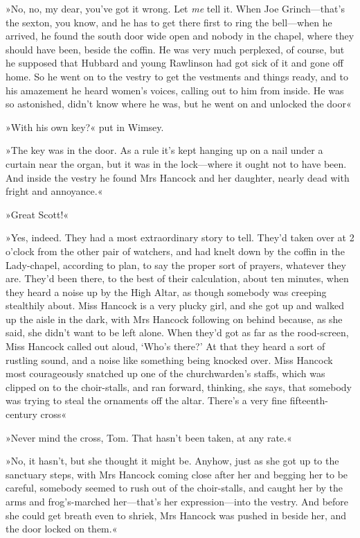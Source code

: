 »No, no, my dear, you've got it wrong. Let \textit{me} tell it. When Joe Grinch—that's the sexton, you know, and he has to get there first to ring the bell—when he arrived, he found the south door wide open and nobody in the chapel, where they should have been, beside the coffin. He was very much perplexed, of course, but he supposed that Hubbard and young Rawlinson had got sick of it and gone off home. So he went on to the vestry to get the vestments and things ready, and to his amazement he heard women's voices, calling out to him from inside. He was so astonished, didn't know where he was, but he went on and unlocked the door\longdash«

»With his own key?« put in Wimsey.

»The key was in the door. As a rule it's kept hanging up on a nail under a curtain near the organ, but it was in the lock—where it ought not to have been. And inside the vestry he found Mrs Hancock and her daughter, nearly dead with fright and annoyance.«

»Great Scott!«

»Yes, indeed. They had a most extraordinary story to tell. They'd taken over at 2 o'clock from the other pair of watchers, and had knelt down by the coffin in the Lady-chapel, according to plan, to say the proper sort of prayers, whatever they are. They'd been there, to the best of their calculation, about ten minutes, when they heard a noise up by the High Altar, as though somebody was creeping stealthily about. Miss Hancock is a very plucky girl, and she got up and walked up the aisle in the dark, with Mrs Hancock following on behind because, as she said, she didn't want to be left alone. When they'd got as far as the rood-screen, Miss Hancock called out aloud, `Who's there?' At that they heard a sort of rustling sound, and a noise like something being knocked over. Miss Hancock most courageously snatched up one of the churchwarden's staffs, which was clipped on to the choir-stalls, and ran forward, thinking, she says, that somebody was trying to steal the ornaments off the altar. There's a very fine fifteenth-century cross\longdash«

»Never mind the cross, Tom. That hasn't been taken, at any rate.«

»No, it hasn't, but she thought it might be. Anyhow, just as she got up to the sanctuary steps, with Mrs Hancock coming close after her and begging her to be careful, somebody seemed to rush out of the choir-stalls, and caught her by the arms and frog's-marched her—that's her expression—into the vestry. And before she could get breath even to shriek, Mrs Hancock was pushed in beside her, and the door locked on them.«


